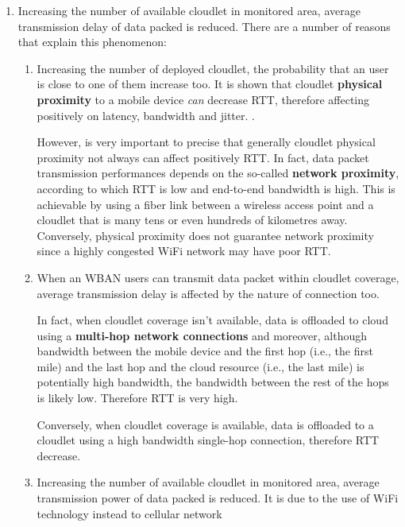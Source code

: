 \documentclass[sigchi]{acmart}
\begin{document}
\begin{enumerate}

\item Increasing the number of available cloudlet in monitored area, average transmission delay of data packed is reduced. There are a number of reasons that explain this phenomenon:

\begin{enumerate}

\item Increasing the number of deployed cloudlet, the probability that an user is close to one of them increase too. It is shown that cloudlet \textbf{physical proximity} to a mobile device \textit{can} decrease RTT, therefore affecting positively on latency, bandwidth and jitter. \cite{TheEmergenceOfEdgeComputing}. 

However, is very important to precise that generally cloudlet physical proximity not always can affect positively RTT. In fact, data packet transmission performances depends on the so-called \textbf{network proximity}, according to which RTT is low and end-to-end bandwidth is high. This is achievable by using a fiber link between a wireless access point and a cloudlet that is many tens or even hundreds of kilometres away. Conversely, physical proximity does not guarantee network proximity since a highly congested WiFi network may have poor RTT.\cite{TheSeminalRoleEdgeNativeApplications}

\item When an WBAN users can transmit data packet within cloudlet coverage, average transmission delay is affected by the nature of connection too. 

In fact, when cloudlet coverage isn't available, data is offloaded to cloud using a \textbf{multi-hop network connections} and moreover, although bandwidth between the mobile device and the first hop (i.e., the first mile) and the last hop and the cloud resource (i.e., the last mile) is potentially high bandwidth, the bandwidth between the rest of the hops is likely low. Therefore RTT is very high.\cite{ArchitecturalTacticsCyberForaging}

Conversely, when cloudlet coverage is available, data is offloaded to a cloudlet using a high bandwidth single-hop connection, therefore RTT decrease.\cite{ArchitecturalTacticsCyberForaging}

\item Increasing the number of available cloudlet in monitored area, average transmission power of data packed is reduced. It is due to the use of WiFi technology instead to cellular network


\end{enumerate}
\end{enumerate}
\end{document}
